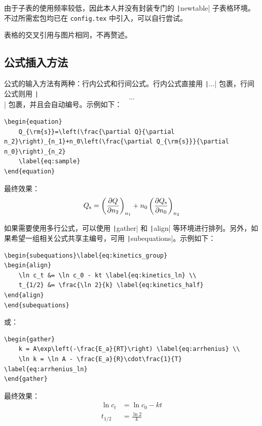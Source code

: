 \documentclass[a4paper,12pt]{article}
\begin{document}
由于子表的使用频率较低，因此本人并没有封装专门的 \texttt|newtable| 子表格环境。不过所需宏包均已在 \texttt{config.tex} 中引入，可以自行尝试。

表格的交叉引用与图片相同，不再赘述。
   
\subsection{公式插入方法}

公式的输入方法有两种：行内公式和行间公式。行内公式直接用 \texttt|$...$| 包裹，行间公式则用 \texttt|\begin{equation} ... \end{equation}| 包裹，并且会自动编号。示例如下：
\begin{verbatim}
\begin{equation}
    Q_{\rm{s}}=\left(\frac{\partial Q}{\partial n_2}\right)_{n_1}+n_0\left(\frac{\partial Q_{\rm{s}}}{\partial n_0}\right)_{n_2}
    \label{eq:sample}
\end{equation}
\end{verbatim}
最终效果：
\begin{equation}
    Q_{\rm{s}}=\left(\frac{\partial Q}{\partial n_2}\right)_{n_1}+n_0\left(\frac{\partial Q_{\rm{s}}}{\partial n_0}\right)_{n_2}
    \label{eq:sample}
\end{equation}

如果需要使用多行公式，可以使用 \texttt|gather| 和 \texttt|align| 等环境进行排列。另外，如果希望一组相关公式共享主编号，可用 \texttt|subequations|。示例如下：
\begin{verbatim}
\begin{subequations}\label{eq:kinetics_group}
\begin{align}
    \ln c_t &= \ln c_0 - kt \label{eq:kinetics_ln} \\
    t_{1/2} &= \frac{\ln 2}{k} \label{eq:kinetics_half}
\end{align}
\end{subequations}
\end{verbatim}
或：
\begin{verbatim}
\begin{gather}
    k = A\exp\left(-\frac{E_a}{RT}\right) \label{eq:arrhenius} \\
    \ln k = \ln A - \frac{E_a}{R}\cdot\frac{1}{T} \label{eq:arrhenius_ln}
\end{gather}
\end{verbatim}
最终效果：
\begin{subequations}\label{eq:kinetics_group}
\begin{align}
    \ln c_t &= \ln c_0 - kt \label{eq:kinetics_ln} \\
    t_{1/2} &= \frac{\ln 2}{k} \label{eq:kinetics_half}
\end{align}
\end{subequations}
\end{document}
